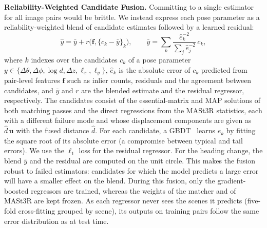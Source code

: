 \noindent\textbf{Reliability-Weighted Candidate Fusion.}
Committing to a single estimator for all image pairs would be brittle. We instead express each pose parameter as a reliability-weighted blend of candidate estimates followed by a learned residual:
\begin{equation}
\hat y=\bar y+r\bigl(\mathbf{f},\{c_k-\bar y\}_k\bigr),\qquad
\bar y=\sum_{k}\frac{\hat e_k^{-2}}{\sum_{j}\hat e_j^{-2}}\,c_k,
\label{eq:blend}
\end{equation}
where $k$ indexes over the candidates $c_k$ of a pose parameter $y\in\{\Delta\theta,\Delta\phi,\log d,\Delta z,\ell_x,\ell_y\}$, $\hat e_k$ is the absolute error of $c_k$ predicted from pair-level features $\mathbf{f}$ such as inlier counts, residuals and the agreement between candidates, and $\bar y$ and $r$ are the blended estimate and the residual regressor, respectively. The candidates consist of the essential-matrix and MAP solutions of both matching passes and the direct regressions from the MASt3R statistics, each with a different failure mode and whose displacement components are given as $\hat d\,\mathbf{u}$ with the fused distance $\hat d$. For each candidate, a GBDT~\citep{ke2017lightgbm} learns $\hat e_k$ by fitting the square root of its absolute error (a compromise between typical and tail errors). We use the $\ell_1$ loss for the residual regressor. For the heading change, the blend $\bar y$ and the residual are computed on the unit circle. This makes the fusion robust to failed estimators: candidates for which the model predicts a large error will have a smaller effect on the blend. During this fusion, only the gradient-boosted regressors are trained, whereas the weights of the matcher and of MASt3R are kept frozen. As each regressor never sees the scenes it predicts (five-fold cross-fitting grouped by scene), its outputs on training pairs follow the same error distribution as at test time.

